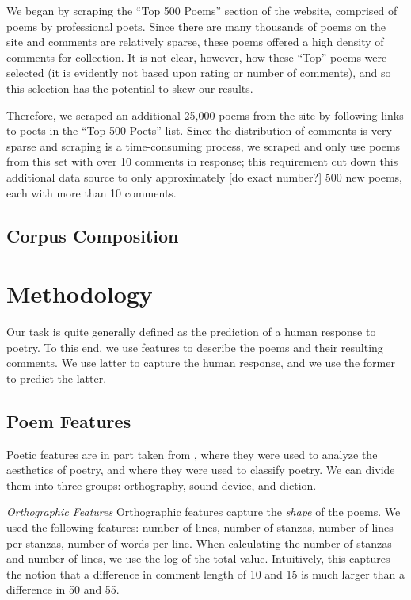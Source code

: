 \documentclass[11pt]{article}
\begin{document}
We began by scraping the ``Top 500 Poems'' section of the website, comprised of poems by professional poets. Since there are many thousands of poems on the site and comments are relatively sparse, these poems offered a high density of comments for collection. It is not clear, however, how these ``Top'' poems were selected (it is evidently not based upon rating or number of comments), and so this selection has the potential to skew our results.

Therefore, we scraped an additional 25,000 poems from the site by following links to poets in the ``Top 500 Poets'' list. Since the distribution of comments is very sparse and scraping is a time-consuming process, we scraped and only use poems from this set with over 10 comments in response; this requirement cut down this additional data source to only approximately [do exact number?] 500 new poems, each with more than 10 comments.

\subsection*{Corpus Composition}

\section{Methodology}
Our task is quite generally defined as the prediction of a human response to poetry. To this end, we use features to describe the poems and their resulting comments. We use latter to capture the human response, and we use the former to predict the latter.

\subsection*{Poem Features}
Poetic features are in part taken from , where they were used to analyze the aesthetics of poetry, and  where they were used to classify poetry. We can divide them into three groups: orthography, sound device, and diction.

\emph{Orthographic Features}
Orthographic features capture the \emph{shape} of the poems. We used the following features: number of lines, number of stanzas, number of lines per stanzas, number of words per line. When calculating the number of stanzas and number of lines, we use the log of the total value. Intuitively, this captures the notion that a difference in comment length of 10 and 15 is much larger than a difference in 50 and 55.
\end{document}
